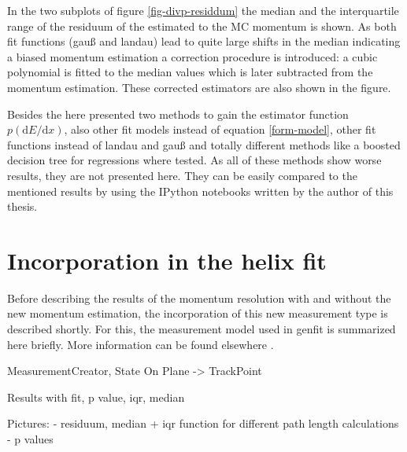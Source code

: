 In the two subplots of figure \ref{fig-divp-residdum} the median and the interquartile range of the residuum of the estimated to the MC momentum is shown. As both fit functions (gauß and landau) lead to quite large shifts in the median indicating a biased momentum estimation a correction procedure is introduced: a cubic polynomial is fitted to the median values which is later subtracted from the momentum estimation. These corrected estimators are also shown in the figure.

Besides the here presented two methods to gain the estimator function $p(\mathrm dE/\mathrm dx)$, also other fit models instead of equation \ref{form-model}, other fit functions instead of landau and gauß and totally different methods like a boosted decision tree for regressions where tested. As all of these methods show worse results, they are not presented here. They can be easily compared to the mentioned results by using the IPython notebooks written by the author of this thesis.

\section{Incorporation in the helix fit}

Before describing the results of the momentum resolution with and without the new momentum estimation, the incorporation of this new measurement type is described shortly. For this, the measurement model used in genfit is summarized here briefly. More information can be found elsewhere \cite{genfit}.

MeasurementCreator, State On Plane -> TrackPoint

Results with fit, p value, iqr, median

Pictures:
- residuum, median + iqr function for different path length calculations
- p values